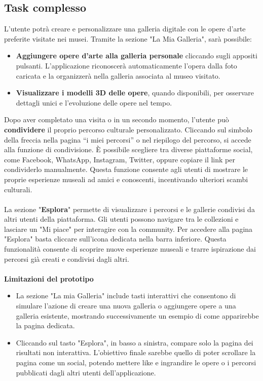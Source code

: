 \documentclass{article}
\begin{document}
\subsection{Task complesso}
L’utente potrà creare e personalizzare una galleria digitale con le opere d’arte preferite visitate nei musei. Tramite la sezione "La Mia Galleria", sarà possibile:
\begin{itemize}
\item \textbf{Aggiungere opere d’arte alla galleria personale} cliccando sugli appositi pulsanti. L’applicazione riconoscerà automaticamente l’opera dalla foto caricata e la organizzerà nella galleria associata al museo visitato.
\item \textbf{Visualizzare i modelli 3D delle opere}, quando disponibili, per osservare dettagli unici e l’evoluzione delle opere nel tempo.
\end{itemize}
Dopo aver completato una visita o in un secondo momento, l’utente può \textbf{condividere} il proprio percorso culturale personalizzato. Cliccando sul simbolo della freccia nella pagina “i miei percorsi” o nel riepilogo del percorso, si accede alla funzione di condivisione. È possibile scegliere tra diverse piattaforme social, come Facebook, WhatsApp, Instagram, Twitter, oppure copiare il link per condividerlo manualmente. Questa funzione consente agli utenti di mostrare le proprie esperienze museali ad amici e conoscenti, incentivando ulteriori scambi culturali.\\
\\
La sezione "\textbf{Esplora}" permette di visualizzare i percorsi e le gallerie condivisi da altri utenti della piattaforma. Gli utenti possono navigare tra le collezioni e lasciare un "Mi piace" per interagire con la community. Per accedere alla pagina "Esplora" basta cliccare sull’icona dedicata nella barra inferiore. Questa funzionalità consente di scoprire nuove esperienze museali e trarre ispirazione dai percorsi già creati e condivisi dagli altri.\\
\\
\textbf{Limitazioni del prototipo}
\begin{itemize}
\item La sezione "La mia Galleria" include tasti interattivi che consentono di simulare l'azione di creare una nuova galleria o aggiungere opere a una galleria esistente, mostrando successivamente un esempio di come apparirebbe la pagina dedicata.
\item Cliccando sul tasto "Esplora", in basso a sinistra, compare solo la pagina dei risultati non interattiva. L'obiettivo finale sarebbe quello di poter scrollare la pagina come un social, potendo mettere like e ingrandire le opere o i percorsi pubblicati dagli altri utenti dell’applicazione.
\end{itemize}
\end{document}
